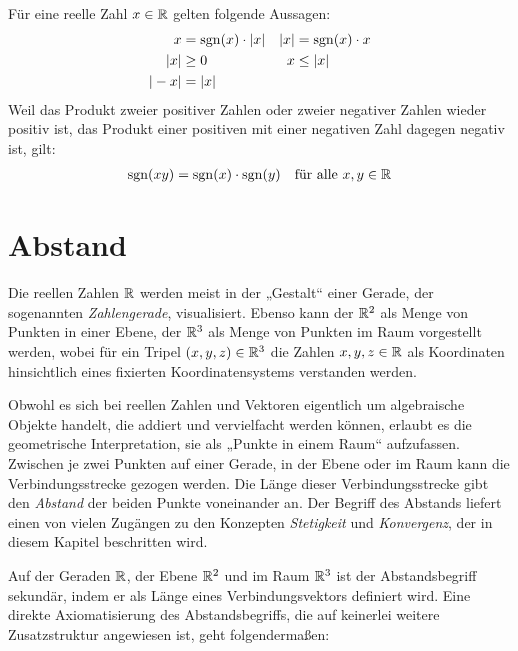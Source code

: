 \begin{bem}
    Für eine reelle Zahl $x\in \mathbb R$ gelten folgende Aussagen:
    \begin{align*}
        x & = \operatorname{sgn}(x)\cdot \vert x\vert & \vert x \vert & = \operatorname{sgn}(x)\cdot x \\
        \vert x\vert & \ge 0 & x & \le \vert x\vert \\
        \vert -x\vert & = \vert x\vert
    \end{align*}
    Weil das Produkt zweier positiver Zahlen oder zweier negativer Zahlen wieder positiv ist, das Produkt einer positiven mit einer negativen Zahl dagegen negativ ist, gilt:
    \begin{align*}
        \operatorname{sgn}(xy) = \operatorname{sgn}(x)\cdot \operatorname{sgn}(y) && \text{für alle $x,y\in \mathbb R$}
    \end{align*}
\end{bem}





\section{Abstand}


\begin{bem}
    Die reellen Zahlen $\mathbb R$ werden meist in der „Gestalt“ einer Gerade, der sogenannten \emph{Zahlengerade}, visualisiert. Ebenso kann der $\mathbb R^2$ als Menge von Punkten in einer Ebene, der $\mathbb R^3$ als Menge von Punkten im Raum vorgestellt werden, wobei für ein Tripel $(x,y,z)\in \mathbb R^3$ die Zahlen $x,y,z\in \mathbb R$ als Koordinaten hinsichtlich eines fixierten Koordinatensystems verstanden werden.
    
    Obwohl es sich bei reellen Zahlen und Vektoren eigentlich um algebraische Objekte handelt, die addiert und vervielfacht werden können, erlaubt es die geometrische Interpretation, sie als „Punkte in einem Raum“ aufzufassen. Zwischen je zwei Punkten auf einer Gerade, in der Ebene oder im Raum kann die Verbindungsstrecke gezogen werden. Die Länge dieser Verbindungsstrecke gibt den \emph{Abstand} der beiden Punkte voneinander an. Der Begriff des Abstands liefert einen von vielen Zugängen zu den Konzepten \emph{Stetigkeit} und \emph{Konvergenz}, der in diesem Kapitel beschritten wird.
    
    Auf der Geraden $\mathbb R$, der Ebene $\mathbb R^2$ und im Raum $\mathbb R^3$ ist der Abstandsbegriff sekundär, indem er als Länge eines Verbindungsvektors definiert wird. Eine direkte Axiomatisierung des Abstandsbegriffs, die auf keinerlei weitere Zusatzstruktur angewiesen ist, geht folgendermaßen:
\end{bem}


